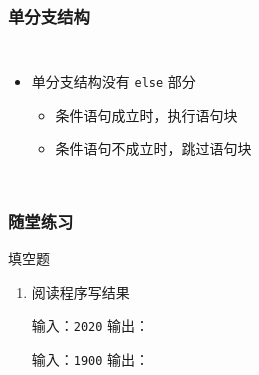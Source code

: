 \begin{frame}[fragile]
    \frametitle{单分支结构}

    \begin{columns}
        \begin{itemize}[<+->]
            \item 单分支结构没有 \lstinline|else| 部分

                \begin{itemize}
                    \item 条件语句成立时，执行语句块
                    \item 条件语句不成立时，跳过语句块
                \end{itemize}

        \end{itemize}

        
    \end{columns}
\end{frame}

\begin{frame}[fragile]
    \frametitle{随堂练习}

    \begin{exampleblock}{填空题}

        \begin{enumerate}
            \item 阅读程序写结果
                

                \small{输入：}\lstinline|2020| \tabto{8em} \small{输出：}

                \small{输入：}\lstinline|1900| \tabto{8em} \small{输出：}
        \end{enumerate}

    \end{exampleblock}
\end{frame}

